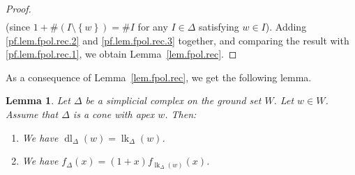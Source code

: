 \documentclass[12pt]{amsart}
\newtheorem{lemma}[theorem]{Lemma}
\theoremstyle{definition}
\DeclareMathOperator{\lk}{lk}
\DeclareMathOperator{\dl}{dl}
\newcommand{\set}[1]{\left\{ #1 \right\}}
\newcommand{\tup}[1]{\left( #1 \right)}
\begin{document}
\begin{proof}
\begin{align}
\end{align}
(since $1 + \# \tup{I \setminus \set{w}} = \# I$ for any $I \in \Delta$ satisfying $w \in I$).
Adding  \eqref{pf.lem.fpol.rec.2} and \eqref{pf.lem.fpol.rec.3} together,
and comparing the result with \eqref{pf.lem.fpol.rec.1},
we obtain Lemma~\ref{lem.fpol.rec}.
\end{proof}

As a consequence of Lemma~\ref{lem.fpol.rec}, we get the following lemma.

\begin{lemma} \label{lem.fpol.cone}
Let $\Delta$ be a simplicial complex on the ground set $W$. Let $w \in W$.
Assume that $\Delta$ is a cone with apex $w$. Then:

\begin{enumerate}

\item[(a)] We have $\dl_\Delta(w) = \lk_\Delta(w)$.

\item[(b)] We have $f_{\Delta}\tup{x} = \tup{1+x} f_{\lk_\Delta(w)}\tup{x}$.

\end{enumerate}
\end{lemma}
\end{document}
